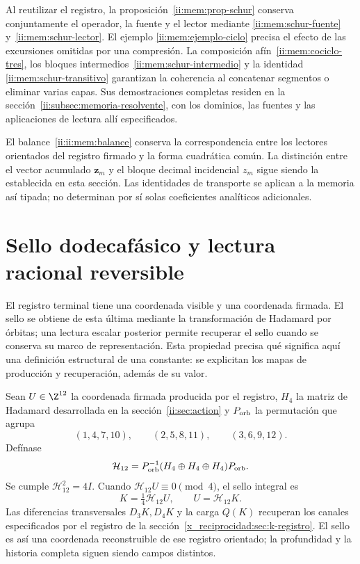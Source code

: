 Al reutilizar el registro, la proposición~\ref{ii:mem:prop-schur} conserva
conjuntamente el operador, la fuente y el lector mediante
\eqref{ii:mem:schur-fuente} y~\eqref{ii:mem:schur-lector}. El ejemplo
\eqref{ii:mem:ejemplo-ciclo} precisa el efecto de las excursiones omitidas
por una compresión. La composición afín~\eqref{ii:mem:cociclo-tres}, los
bloques intermedios~\eqref{ii:mem:schur-intermedio} y la identidad
\eqref{ii:mem:schur-transitivo} garantizan la coherencia al concatenar
segmentos o eliminar varias capas. Sus demostraciones completas residen
en la sección~\ref{ii:subsec:memoria-resolvente}, con los dominios, las
fuentes y las aplicaciones de lectura allí especificados.

El balance~\eqref{ii:ii:mem:balance} conserva la correspondencia entre los
lectores orientados del registro firmado y la forma cuadrática común.
La distinción entre el vector acumulado \(\mathbf z_m\) y el bloque
decimal incidencial \(z_m\) sigue siendo la establecida en esta sección.
Las identidades de transporte se aplican a la memoria así tipada; no
determinan por sí solas coeficientes analíticos adicionales.




\section{Sello dodecafásico y lectura racional reversible}
\label{ii:sec:sello}

El registro terminal tiene una coordenada visible y una coordenada
firmada. El sello se obtiene de esta última mediante la transformación
de Hadamard por órbitas; una lectura escalar posterior permite recuperar
el sello cuando se conserva su marco de representación. Esta propiedad
precisa qué significa aquí una definición estructural de una constante:
se explicitan los mapas de producción y recuperación, además de su valor.

Sean $U\in\Z^{12}$ la coordenada firmada producida por el registro,
$H_4$ la matriz de Hadamard desarrollada en la sección~\ref{ii:sec:action}
y $P_{\rm orb}$ la permutación que agrupa
\[
 (1,4,7,10),\qquad(2,5,8,11),\qquad(3,6,9,12).
\]
Defínase
\[
 \mathcal H_{12}=P_{\rm orb}^{-1}
 (H_4\oplus H_4\oplus H_4)P_{\rm orb}.
\]
Se cumple $\mathcal H_{12}^2=4I$. Cuando
$\mathcal H_{12}U\equiv0\pmod4$, el sello integral es
\[
 K=\tfrac14\mathcal H_{12}U,
 \qquad U=\mathcal H_{12}K.
\]
Las diferencias transversales $D_3K,D_4K$ y la carga $Q(K)$ recuperan
los canales especificados por el registro de la sección~\ref{x_reciprocidad:sec:k-registro}.
El sello es así una coordenada reconstruible de ese registro orientado;
la profundidad y la historia completa siguen siendo campos distintos.

